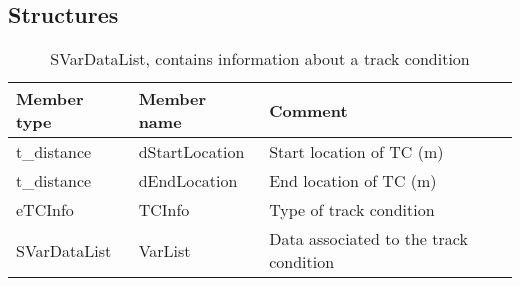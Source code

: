 \documentclass{template/openetcs_article}
\begin{document}
\newpage
\subsection{Structures}
\begin{longtable}{|l|l|l|}
	\caption{SVarDataList, contains information about a track condition} \\ 
	\hline
		\begin{minipage}[t]{0.20\linewidth} \textbf{Member type}	\end{minipage}
	&	\begin{minipage}[t]{0.20\linewidth} \textbf{Member name}	\end{minipage} 
	&	\begin{minipage}[t]{0.65\linewidth} \textbf{Comment} \end{minipage} \\
	\hline
		\begin{minipage}[t]{0.20\linewidth} t\_distance	\end{minipage} 
	&	\begin{minipage}[t]{0.20\linewidth} dStartLocation \end{minipage} 
	&	\begin{minipage}[t]{0.65\linewidth} Start location of TC (m) \end{minipage}\\
	\hline
		\begin{minipage}[t]{0.20\linewidth} t\_distance	\end{minipage} 
	&	\begin{minipage}[t]{0.20\linewidth} dEndLocation \end{minipage} 
	&	\begin{minipage}[t]{0.65\linewidth} End location of TC (m) \end{minipage}\\
	\hline
		\begin{minipage}[t]{0.20\linewidth} eTCInfo	\end{minipage} 
	&	\begin{minipage}[t]{0.20\linewidth} TCInfo \end{minipage} 
	&	\begin{minipage}[t]{0.65\linewidth} Type of track condition \end{minipage}\\
	\hline
		\begin{minipage}[t]{0.20\linewidth} SVarDataList \end{minipage} 
	&	\begin{minipage}[t]{0.20\linewidth} VarList \end{minipage} 
	&	\begin{minipage}[t]{0.65\linewidth} Data associated to the track condition \end{minipage}\\
	\hline
\end{longtable}
\end{document}
